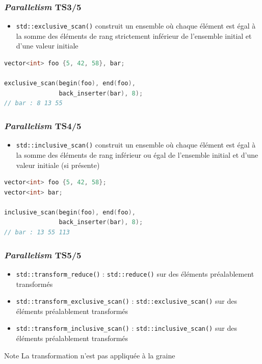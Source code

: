 \documentclass[C++.tex]{subfiles}
\begin{document}
\begin{frame}[fragile]
	\frametitle{\textit{Parallelism} TS\titlehfill{}3/5}
	\begin{itemize}
		\item \lstinline|std::exclusive_scan()| construit un ensemble où chaque élément est égal à la somme des éléments de rang strictement inférieur de l'ensemble initial et d'une valeur initiale
	\end{itemize}

	\begin{lstlisting}[language=C++]
vector<int> foo {5, 42, 58}, bar;

exclusive_scan(begin(foo), end(foo), 
               back_inserter(bar), 8);
// bar : 8 13 55\end{lstlisting}
\end{frame}

\begin{frame}[fragile]
	\frametitle{\textit{Parallelism} TS\titlehfill{}4/5}
	\begin{itemize}
		\item \lstinline|std::inclusive_scan()| construit un ensemble où chaque élément est égal à la somme des éléments de rang inférieur ou égal de l'ensemble initial et d'une valeur initiale (si présente)
	\end{itemize}

	\begin{lstlisting}[language=C++]
vector<int> foo {5, 42, 58};
vector<int> bar;

inclusive_scan(begin(foo), end(foo), 
               back_inserter(bar), 8);
// bar : 13 55 113\end{lstlisting}

\end{frame}

\begin{frame}[fragile]
	\frametitle{\textit{Parallelism} TS\titlehfill{}5/5}
	\begin{itemize}
		\item \lstinline|std::transform_reduce()| : \lstinline|std::reduce()| sur des éléments préalablement transformés
		\item \lstinline|std::transform_exclusive_scan()| : \lstinline|std::exclusive_scan()| sur des éléments préalablement transformés
		\item \lstinline|std::transform_inclusive_scan()| : \lstinline|std::inclusive_scan()| sur des éléments préalablement transformés
	\end{itemize}

	\begin{block}{Note}
		La transformation n'est pas appliquée à la graine
	\end{block}
\end{frame}
\end{document}
